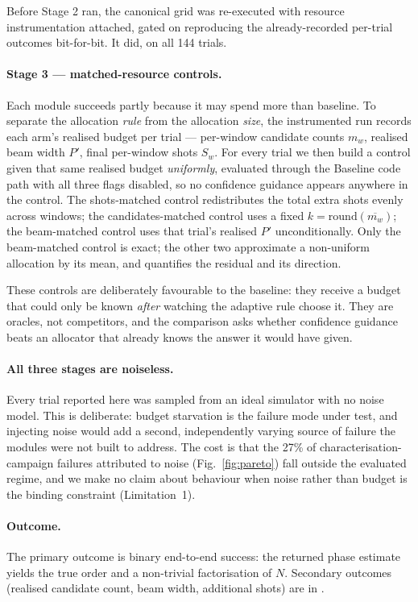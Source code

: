 Before Stage 2 ran, the canonical grid was re-executed with resource
instrumentation attached, gated on reproducing the already-recorded
per-trial outcomes bit-for-bit. It did, on all 144 trials.

\paragraph{Stage 3 --- matched-resource controls.} Each module succeeds
partly because it may spend more than baseline. To separate the
allocation \emph{rule} from the allocation \emph{size}, the instrumented
run records each arm's realised budget per trial --- per-window candidate
counts $m_w$, realised beam width $P'$, final per-window shots $S_w$. For
every trial we then build a control given that same realised budget
\emph{uniformly}, evaluated through the Baseline code path with all three
flags disabled, so no confidence guidance appears anywhere in the
control. The shots-matched control redistributes the total extra shots
evenly across windows; the candidates-matched control uses a fixed
$k=\mathrm{round}(\overline{m_w})$; the beam-matched control uses that
trial's realised $P'$ unconditionally. Only the beam-matched control is
exact; the other two approximate a non-uniform allocation by its mean,
and \SItables{} quantifies the residual and its direction.

These controls are deliberately favourable to the baseline: they receive
a budget that could only be known \emph{after} watching the adaptive rule
choose it. They are oracles, not competitors, and the comparison asks
whether confidence guidance beats an allocator that already knows the
answer it would have given.

\paragraph{All three stages are noiseless.} Every trial reported here was
sampled from an ideal simulator with no noise model. This is deliberate:
budget starvation is the failure mode under test, and injecting noise
would add a second, independently varying source of failure the modules
were not built to address. The cost is that the 27\% of
characterisation-campaign failures attributed to noise
(Fig.~\ref{fig:pareto}) fall outside the evaluated regime, and we make no
claim about behaviour when noise rather than budget is the binding
constraint (Limitation~1).

\paragraph{Outcome.} The primary outcome is binary end-to-end success:
the returned phase estimate yields the true order and a non-trivial
factorisation of $N$. Secondary outcomes (realised candidate count, beam
width, additional shots) are in \SItables{}.
